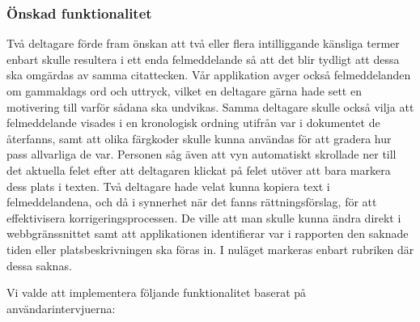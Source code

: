 \documentclass[swedish]{maucsthesis}
\begin{document}
\subsubsection{Önskad funktionalitet}\label{önskvärdafunktioner}

Två deltagare förde fram önskan att två eller flera intilliggande känsliga
termer enbart skulle resultera i ett enda felmeddelande så att det blir tydligt
att dessa ska omgärdas av samma citattecken. Vår applikation avger också
felmeddelanden om gammaldags ord och uttryck, vilket en deltagare gärna hade
sett en motivering till varför sådana ska undvikas. Samma deltagare skulle också
vilja att felmeddelande visades i en kronologisk ordning utifrån var i
dokumentet de återfanns, samt att olika färgkoder skulle kunna användas för att
gradera hur pass allvarliga de var. Personen såg även att vyn automatiskt
skrollade ner till det aktuella felet efter att deltagaren klickat på felet
utöver att bara markera dess plats i texten. Två deltagare hade velat kunna
kopiera text i felmeddelandena, och då i synnerhet när det fanns
rättningsförslag, för att effektivisera korrigeringsprocessen. De ville att man
skulle kunna ändra direkt i webbgränssnittet samt att applikationen identifierar
var i rapporten den saknade tiden eller platsbeskrivningen ska föras in. I
nuläget markeras enbart rubriken där dessa saknas.

Vi valde att implementera följande funktionalitet baserat på
användarintervjuerna:
\end{document}
